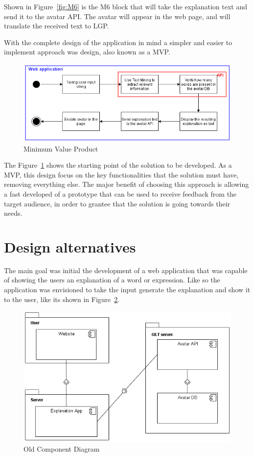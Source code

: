 Shown in Figure~\ref{fig:M6} is the M6 block that will take the explanation text and send it to the avatar \gls{API}.
The avatar will appear in the web page, and will translate the received text to \gls{LGP}.

With the complete design of the application in mind a simpler and easier to implement approach was design, also known as a \gls{MVP}.

\begin{figure}[H]
\centering
\includegraphics[scale=0.5]{ch4/assets/mvp_2.png}
\caption[Minimun Value Product]{Minimum Value Product}
\label{fig:mvp}
\end{figure}

The Figure~\ref{fig:mvp} shows the starting point of the solution to be developed.
As a \gls{MVP}, this design focus on the key functionalities that the solution must have, removing everything else.
The major benefit of choosing this approach is allowing a fast developed of a prototype that can be used to receive feedback from the target audience, in order to grantee that the solution is going towards their needs.

\section{Design alternatives}

The main goal was initial the development of a web application that was capable of showing the users an explanation of a word or expression.
Like so the application was envisioned to take the input generate the explanation and show it to the user, like its shown in Figure~\ref{fig:ocd}.

\begin{figure}[H]
\centering
\includegraphics[scale=0.5]{ch4/assets/component_diagram_old.png}
\caption[Old Component Diagram]{Old Component Diagram}
\label{fig:ocd}
\end{figure}

